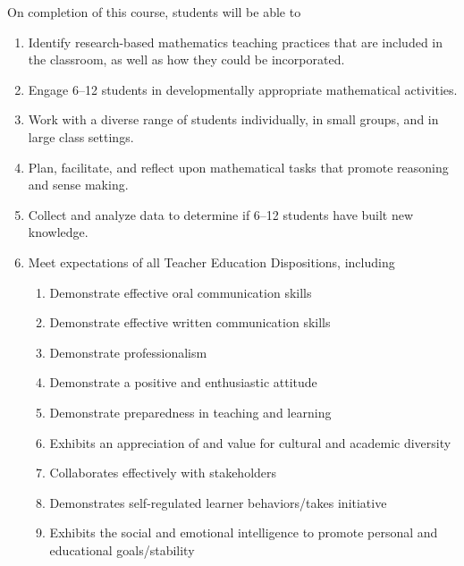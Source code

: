 \documentclass[11pt]{article}
\newenvironment{alphalist}{
\begin{enumerate}[label=(\arabic*),widest=107 ,leftmargin=25pt, itemsep=0pt]}
{\end{enumerate}}
\newenvironment{betalist}{
\begin{enumerate}[label=(\alph*),widest=zzz,leftmargin=25pt,itemsep=0pt]}
{\end{enumerate}}
\begin{document}
On completion of this course, students will be able to
\begin{alphalist}
\item Identify research-based mathematics teaching practices that are included in the classroom, as well as how they could be incorporated.
\item Engage 6--12 students in developmentally appropriate mathematical activities. 
\item Work with a diverse range of students individually, in small groups, and in large class settings.
\item Plan, facilitate, and reflect upon mathematical tasks that promote reasoning and sense making.
\item Collect and analyze data to determine if 6--12 students have built new knowledge.
\item Meet expectations of all Teacher Education Dispositions, including
\begin{betalist}
    \item Demonstrate effective oral communication skills
    \item Demonstrate effective written communication skills
    \item Demonstrate professionalism
    \item Demonstrate a positive and enthusiastic attitude
    \item Demonstrate preparedness in teaching and learning
    \item Exhibits an appreciation of and value for cultural and academic diversity
    \item Collaborates effectively with stakeholders
    \item Demonstrates self-regulated learner behaviors/takes initiative
    \item Exhibits the social and emotional intelligence to promote personal and educational goals/stability
\end{betalist}
\end{alphalist}
\end{document}
